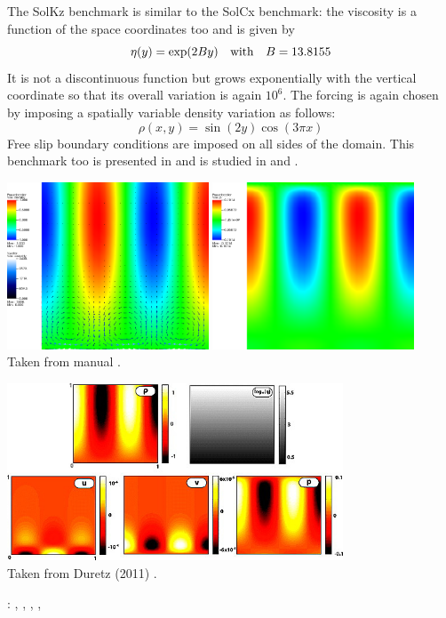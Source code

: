 

The SolKz benchmark is similar to the SolCx benchmark: 
the viscosity is a function of the space coordinates too and is given by 
\[
\eta(y)=\exp(2By) \quad {\rm with} \quad B=13.8155
\]
It is not a discontinuous function but grows exponentially with the 
vertical coordinate so that its overall variation is again $10^6$. 
The forcing is again chosen by imposing a spatially variable density variation as follows:
\[
\rho(x,y)=\sin(2y) \cos(3\pi x)
\]
Free slip boundary conditions are imposed on all sides of the domain.
This benchmark too is presented in \cite{zhon96} and is studied in \cite{dumg11} and \cite{gemd13}.

\begin{center}
\includegraphics[width=6cm]{images/benchmark_solkz/solkz-solution}
\includegraphics[width=6cm]{images/benchmark_solkz/solkz-solution-pressure}\\
{\captionfont Taken from \aspect manual \cite{aspectmanual}.}
\end{center}


\begin{center}
\includegraphics[width=10cm]{images/benchmark_solkz/dumg11}\\
{\captionfont Taken from Duretz \etal (2011) \cite{dumg11}.}
\end{center}

\Literature: \cite{mozg96}, \cite{mamo08}, \cite{vemmXX}, \cite{demh19}, \cite{repa87}
